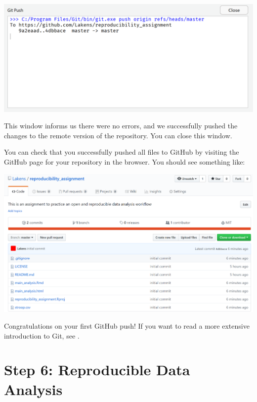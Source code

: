\documentclass[
  oneside]{krantz}
\begin{document}
\begin{center}\includegraphics[width=1\linewidth]{images/8b77f09c9c2cad752ec90ecdfa42e566} \end{center}

This window informs us there were no errors, and we successfully pushed the
changes to the remote version of the repository. You can close this window.

You can check that you successfully pushed all files to GitHub by visiting the
GitHub page for your repository in the browser. You should see something like:

\begin{center}\includegraphics[width=1\linewidth]{images/9eb79724ec82b5a99d62938388c43d3a} \end{center}

Congratulations on your first GitHub push! If you want to read a more extensive introduction to Git, see \citet{vuorre_curating_2018}.

\hypertarget{step-6-reproducible-data-analysis}{%
\section{Step 6: Reproducible Data Analysis}\label{step-6-reproducible-data-analysis}}
\end{document}
